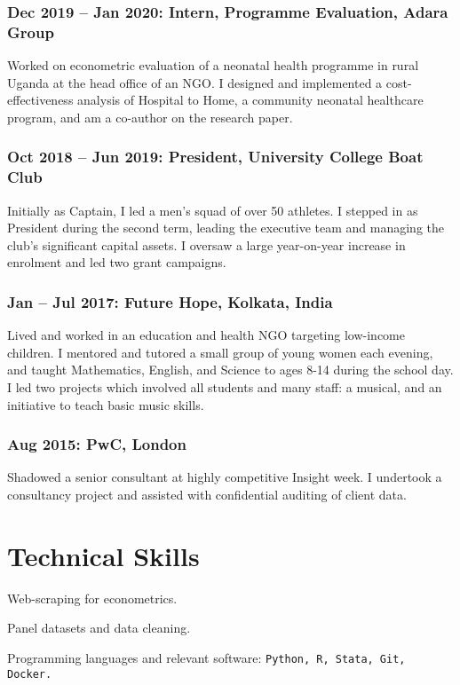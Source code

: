 \documentclass[letterpaper]{article}
\renewenvironment{itemize}{
  \begin{list}{}{
    \setlength{\leftmargin}{1.5em}
  }
}{
  \end{list}
}
\begin{document}
\subsubsection*{Dec 2019 -- Jan 2020: Intern, Programme Evaluation, Adara Group}
Worked on econometric evaluation of a neonatal health programme in rural Uganda at the head office of an NGO. I designed and implemented a cost-effectiveness analysis of Hospital to Home, a community neonatal healthcare program, and am a co-author on the research paper.
\subsubsection*{Oct 2018 -- Jun 2019: President, University College Boat Club}
Initially as Captain, I led a men’s squad of over 50 athletes. I stepped in as President during the second term, leading the executive team and managing the club’s significant capital assets. I oversaw a large year-on-year increase in enrolment and led two grant campaigns.
\subsubsection*{Jan -- Jul 2017: Future Hope, Kolkata, India}
Lived and worked in an education and health NGO targeting low-income children. I mentored and tutored a small group of young women each evening, and taught Mathematics, English, and Science to ages 8-14 during the school day. I led two projects which involved all students and many staff: a musical, and an initiative to teach basic music skills. 
\subsubsection*{Aug 2015: PwC, London}
Shadowed a senior consultant at highly competitive Insight week. I undertook a consultancy project and assisted with confidential auditing of client data.

\section*{Technical Skills}
\begin{itemize}
	\item Web-scraping for econometrics.
	\item Panel datasets and data cleaning.
	\item Programming languages and relevant software: \tt Python, R, Stata, Git, Docker.
\end{itemize}
\end{document}
